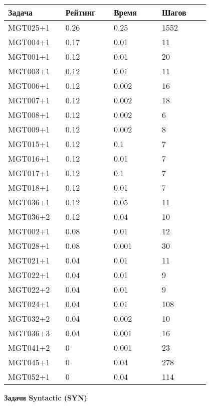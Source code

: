 \begin{longtable}[H]{|p{0.2\linewidth}|p{0.2\linewidth}|p{0.2\linewidth}|p{0.2\linewidth}|}
\hline
\textbf{Задача} & \textbf{Рейтинг} & \textbf{Время} & \textbf{Шагов} \\
\hline
MGT025+1 &  0.26 &  0.25 &  1552 \\
\hline
MGT004+1 &  0.17 &  0.01 &  11 \\
\hline
MGT001+1 &  0.12 &  0.01 &  20 \\
\hline
MGT003+1 &  0.12 &  0.01 &  11 \\
\hline
MGT006+1 &  0.12 &  0.002 &  16 \\
\hline
MGT007+1 &  0.12 &  0.002 &  18 \\
\hline
MGT008+1 &  0.12 &  0.002 &  6 \\
\hline
MGT009+1 &  0.12 &  0.002 &  8 \\
\hline
MGT015+1 &  0.12 &  0.1 &  7 \\
\hline
MGT016+1 &  0.12 &  0.01 &  7 \\
\hline
MGT017+1 &  0.12 &  0.1 &  7 \\
\hline
MGT018+1 &  0.12 &  0.01 &  7 \\
\hline
MGT036+1 &  0.12 &  0.05 &  11 \\
\hline
MGT036+2 &  0.12 &  0.04 &  10 \\
\hline
MGT002+1 &  0.08 &  0.01 &  12 \\
\hline
MGT028+1 &  0.08 &  0.001 &  30 \\
\hline
MGT021+1 &  0.04 &  0.01 &  11 \\
\hline
MGT022+1 &  0.04 &  0.01 &  9 \\
\hline
MGT022+2 &  0.04 &  0.01 &  9 \\
\hline
MGT024+1 &  0.04 &  0.01 &  108 \\
\hline
MGT032+2 &  0.04 &  0.002 &  10 \\
\hline
MGT036+3 &  0.04 &  0.001 &  16 \\
\hline
MGT041+2 &  0 &  0.001 &  23 \\
\hline
MGT045+1 &  0 &  0.04 &  278 \\
\hline
MGT052+1 &  0 &  0.04 &  114 \\
\hline
\end{longtable}


\textbf{Задачи Syntactic (SYN)}

